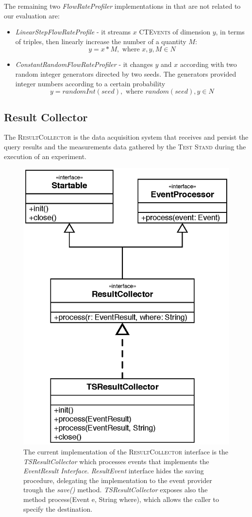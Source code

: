 The remaining two  \textit{FlowRateProfiler} implementations in \name that are not related to our evaluation are:
\begin{itemize}
\item \textit{LinearStepFlowRateProfile} - it streams $x$ \textsc{CTEvents} of dimension $y$, in terms of triples, then linearly increase the number of a quantity $M$: \[y=x*M, \text{ where } x,y,M \in N\]
\item \textit{ConstantRandomFlowRateProfiler} - it changes $y$ and $x$ according with two random integer generators directed by two seeds. The generators provided integer numbers according to a certain probability \[y=randomInt(seed), \text{ where } random(seed),y \in N\]
\end{itemize}


\subsection{Result Collector} 

\noindent The \textsc{ResultCollector} is the data acquisition system that receives and persist the query results and the measurements data gathered by the \textsc{Test Stand} during the execution of an experiment.

\begin{figure}[tbh]
  \centering
	\includegraphics[width=0.5\linewidth]{images/uml_resultcollector}
	\caption[\textsc{ResultCollector} Current Implementation - UML Schema]{The current implementation of the \textsc{ResultCollector} interface is the \textit{TSResultCollector} which processes events that implements the \textit{EventResult Interface}. \textit{ResultEvent} interface hides the saving procedure, delegating the implementation to the event provider trough    the \textit{save()} method. \textit{TSResultCollector} exposes also the method process(Event e, String where), which allows the caller to specify the destination. } 
  	\label{fig:uml_resultcollector}
\end{figure}

